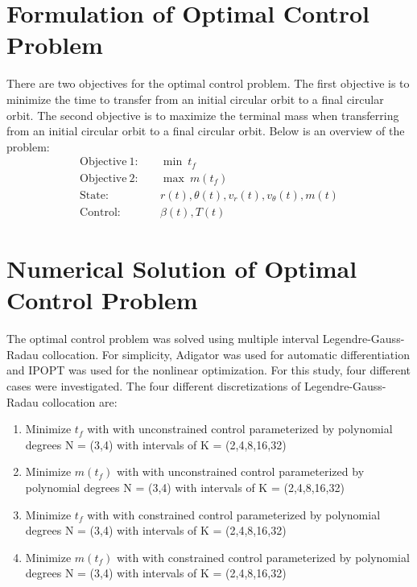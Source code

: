 \documentclass[]{article}
\begin{document}
	\section{Formulation of Optimal Control Problem}
	There are two objectives for the optimal control problem. The first objective is to minimize the time to transfer from an initial circular orbit to a final circular orbit. The second objective is to maximize the terminal mass when transferring from an initial circular orbit to a final circular orbit. Below is an overview of the problem:
\begin{align*}
	\mathrm{Objective \ 1}:& \quad \min\ t_f \\
	\mathrm{Objective \ 2}:& \quad \max\ m(t_f) \\
	\mathrm{State}:&     \quad r(t), \theta(t), v_r(t), v_\theta(t), m(t) \\
	\mathrm{Control}:&   \quad \beta(t), T(t)
\end{align*}

	\section{Numerical Solution of Optimal Control Problem}
	The optimal control problem was solved using multiple interval Legendre-Gauss-Radau collocation. For simplicity, Adigator was used for automatic differentiation and IPOPT was used for the nonlinear optimization. For this study, four different cases were investigated. The four different discretizations of Legendre-Gauss-Radau collocation are:
	\begin{enumerate}
		\item Minimize \(t_f\) with with unconstrained control parameterized by polynomial degrees N = (3,4) with intervals of K = (2,4,8,16,32)
		\item Minimize \(m(t_f)\) with with unconstrained control parameterized by polynomial degrees N = (3,4) with intervals of K = (2,4,8,16,32)
		\item Minimize \(t_f\) with with constrained control parameterized by polynomial degrees N = (3,4) with intervals of K = (2,4,8,16,32)
		\item Minimize \(m(t_f)\) with with constrained control parameterized by polynomial degrees N = (3,4) with intervals of K = (2,4,8,16,32)
	\end{enumerate}
%     
\end{document}
